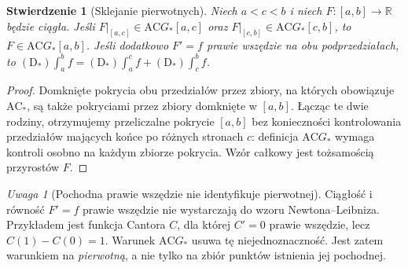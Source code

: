 \documentclass[11pt,a4paper]{article}
\numberwithin{equation}{section}
\theoremstyle{plain}
\newtheorem{stwierdzenie}[twierdzenie]{Stwierdzenie}
\theoremstyle{definition}
\theoremstyle{remark}
\newtheorem{uwaga}[twierdzenie]{Uwaga}
\newcommand{\R}{\mathbb R}
\newcommand{\AC}{\mathrm{AC}}
\begin{document}
\begin{stwierdzenie}[Sklejanie pierwotnych]\label{st:denjoy-sklejanie}
Niech $a<c<b$ i niech $F:[a,b]\to\R$ będzie ciągła. Jeśli $F|_{[a,c]}\in\AC G_*[a,c]$ oraz $F|_{[c,b]}\in\AC G_*[c,b]$, to $F\in\AC G_*[a,b]$. Jeśli dodatkowo $F'=f$ prawie wszędzie na obu podprzedziałach, to $(\mathrm D_*)\int_a^b f=(\mathrm D_*)\int_a^c f+(\mathrm D_*)\int_c^b f$.
\end{stwierdzenie}
\begin{proof}
Domknięte pokrycia obu przedziałów przez zbiory, na których obowiązuje $\AC_*$, są także pokryciami przez zbiory domknięte w $[a,b]$. Łącząc te dwie rodziny, otrzymujemy przeliczalne pokrycie $[a,b]$ bez konieczności kontrolowania przedziałów mających końce po różnych stronach $c$: definicja $\AC G_*$ wymaga kontroli osobno na każdym zbiorze pokrycia. Wzór całkowy jest tożsamością przyrostów $F$.
\end{proof}
\begin{uwaga}[Pochodna prawie wszędzie nie identyfikuje pierwotnej]
Ciągłość i równość $F'=f$ prawie wszędzie nie wystarczają do wzoru Newtona--Leibniza. Przykładem jest funkcja Cantora $C$, dla której $C'=0$ prawie wszędzie, lecz $C(1)-C(0)=1$. Warunek $\AC G_*$ usuwa tę niejednoznaczność. Jest zatem warunkiem na \emph{pierwotną}, a nie tylko na zbiór punktów istnienia jej pochodnej.
\end{uwaga}
\end{document}
